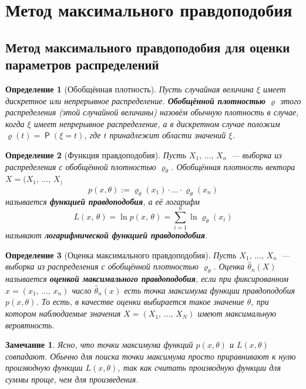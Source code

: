 \documentclass[12pt]{article}
\DeclareMathOperator{\prob}{\mathsf{P}}
\newtheorem*{definition*}{Определение}
\newtheorem*{comment*}{Замечание}
\begin{document}
    \section{Метод максимального правдоподобия}
    \subsection{Метод максимального правдоподобия для оценки параметров распределений}
    \begin{definition*}[Обобщённая плотность]
        Пусть случайная величина $\xi$ имеет дискретное или непрерывное распределение. \textbf{Обобщённой плотностью} $\varrho$ этого распределения (этой случайной величины) назовём обычную плотность в случае, когда $\xi$ имеет непрерывное распределение, а в дискретном случае положим $\varrho(t) = \prob(\xi = t)$, где $t$ принадлежит области значений $\xi$.
    \end{definition*}
    \begin{definition*}[Функция правдоподобия]
        Пусть $X_1,\,\ldots,\,X_n$~--- выборка из распределения с обобщённой плотностью $\varrho_\theta$. Обобщённая плотность вектора $X = (X_1,\,\ldots,\,X_)$
        \begin{equation*}
            p(x, \theta) := \varrho_\theta(x_1) \cdot \ldots \cdot \varrho_\theta(x_n)
        \end{equation*}
        называется \textbf{функцией правдоподобия}, а её логарифм
        \begin{equation*}
            L(x,\,\theta) = \ln p(x,\,\theta) = \sum_{i=1}^n \ln \varrho_\theta(x_i)
        \end{equation*}
        называют \textbf{логарифмической функцией правдоподобия}.
    \end{definition*}
    \begin{definition*}[Оценка максимального правдоподобия]
        Пусть $X_1,\,\ldots,\,X_n$~--- выборка из распределения с обобщённой плотностью $\varrho_\theta$. Оценка $\widehat{\theta}_n(X)$ называется \textbf{оценкой максимального правдоподобия}, если при фиксированном $x = (x_1,\,\ldots,\, x_n)$ число $\widehat{\theta}_n(x)$ есть точка максимума функции правдоподобия $p(x, \theta)$. То есть, в качестве оценки выбирается такое значение $\theta$, при котором наблюдаемые значения $X = (X_1,\, \ldots,\, X_N)$ имеют максимальную вероятность.
    \end{definition*}
    \begin{comment*}
        Ясно, что точки максимума функций $p(x, \theta)$ и $L(x, \theta)$ совпадают. Обычно для поиска точки максимума просто приравнивают к нулю производную функции $L(x, \theta)$, так как считать производную функции для суммы проще, чем для произведения.
    \end{comment*}
\end{document}
